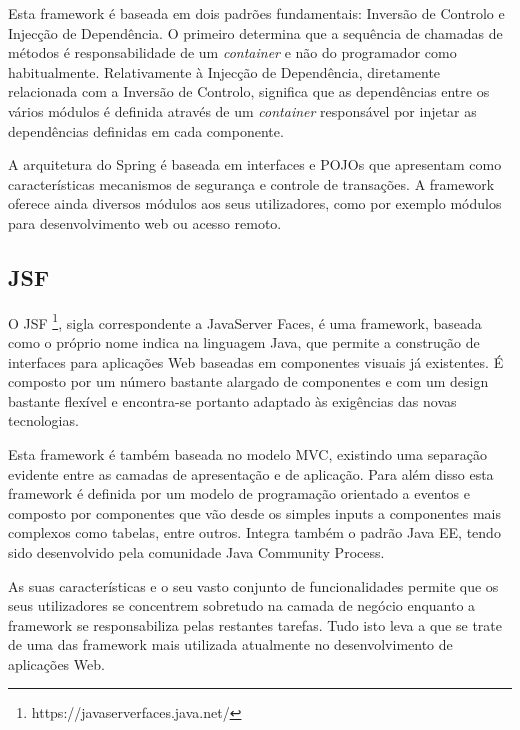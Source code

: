 Esta framework é baseada em dois padrões fundamentais: Inversão de Controlo e Injecção de Dependência. O primeiro determina que a sequência de chamadas de métodos é responsabilidade de um \textit{container} e não do programador como habitualmente. Relativamente à Injecção de Dependência, diretamente relacionada com a Inversão de Controlo, significa que as dependências entre os vários módulos é definida através de um \textit{container} responsável por injetar as dependências definidas em cada componente.

A arquitetura do Spring é baseada em interfaces e POJOs que apresentam como características mecanismos de segurança e controle de transações. A framework oferece ainda diversos módulos aos seus utilizadores, como por exemplo módulos para desenvolvimento web ou acesso remoto.

\subsection{JSF}

O JSF \footnote{https://javaserverfaces.java.net/}, sigla correspondente a JavaServer Faces, é uma framework, baseada como o próprio nome indica na linguagem Java, que permite a construção de interfaces para aplicações Web baseadas em componentes visuais já existentes. É composto por um número bastante alargado de componentes e com um design bastante flexível e encontra-se portanto adaptado às exigências das novas tecnologias.

Esta framework é também baseada no modelo MVC, existindo uma separação evidente entre as camadas de apresentação e de aplicação. Para além disso esta framework é definida por um modelo de programação orientado a eventos e composto por componentes que vão desde os simples inputs a componentes mais complexos como tabelas, entre outros. Integra também o padrão Java EE, tendo sido desenvolvido pela comunidade Java Community Process.

As suas características e o seu vasto conjunto de funcionalidades permite que os seus utilizadores se concentrem sobretudo na camada de negócio enquanto a framework se responsabiliza pelas restantes tarefas. Tudo isto leva a que se trate de uma das framework mais utilizada atualmente no desenvolvimento de aplicações Web.



